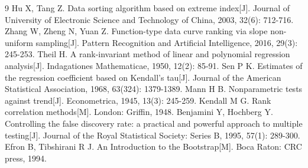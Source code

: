 \documentclass[11pt]{article}
\begin{document}
\begin{thebibliography}{9}
 Hu X, Tang Z. Data sorting algorithm based on extreme index[J]. Journal of University of Electronic Science and Technology of China, 2003, 32(6): 712-716.
 Zhang W, Zheng N, Yuan Z. Function-type data curve ranking via slope non-uniform sampling[J]. Pattern Recognition and Artificial Intelligence, 2016, 29(3): 245-253.
 Theil H. A rank-invariant method of linear and polynomial regression analysis[J]. Indagationes Mathematicae, 1950, 12(2): 85-91.
 Sen P K. Estimates of the regression coefficient based on Kendall's tau[J]. Journal of the American Statistical Association, 1968, 63(324): 1379-1389.
 Mann H B. Nonparametric tests against trend[J]. Econometrica, 1945, 13(3): 245-259.
 Kendall M G. Rank correlation methods[M]. London: Griffin, 1948.
 Benjamini Y, Hochberg Y. Controlling the false discovery rate: a practical and powerful approach to multiple testing[J]. Journal of the Royal Statistical Society: Series B, 1995, 57(1): 289-300.
 Efron B, Tibshirani R J. An Introduction to the Bootstrap[M]. Boca Raton: CRC press, 1994.
\end{thebibliography}
\end{document}
